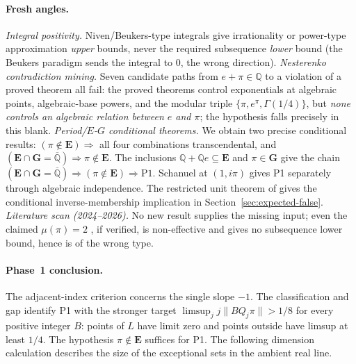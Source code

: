 \documentclass[11pt]{amsart}
\theoremstyle{definition}
\theoremstyle{remark}
\numberwithin{equation}{section}
\newcommand{\Q}{\mathbb{Q}}
\begin{document}
\paragraph{Fresh angles.}
\emph{Integral positivity.} Niven/Beukers-type integrals give irrationality or power-type approximation \emph{upper} bounds, never the required subsequence \emph{lower} bound (the Beukers paradigm sends the integral to $0$, the wrong direction). \emph{Nesterenko contradiction mining.} Seven candidate paths from $e+\pi\in\Q$ to a violation of a proved theorem all fail: the proved theorems control exponentials at algebraic points, algebraic-base powers, and the modular triple $\{\pi,e^\pi,\Gamma(1/4)\}$, but \emph{none controls an algebraic relation between $e$ and $\pi$}; the hypothesis falls precisely in this blank. \emph{Period/$E$-$G$ conditional theorems.} We obtain two precise conditional results: $(\pi\notin\mathbf{E})\Rightarrow$ all four combinations transcendental, and $(\mathbf{E}\cap\mathbf{G}=\overline{\Q})\Rightarrow\pi\notin\mathbf{E}$. The inclusions $\Q+\Q e\subseteq\mathbf E$ and $\pi\in\mathbf G$ give the chain $(\mathbf E\cap\mathbf G=\overline{\Q})\Rightarrow(\pi\notin\mathbf E)\Rightarrow\mathrm{P1}$. Schanuel at $(1,i\pi)$ gives P1 separately through algebraic independence. The restricted unit theorem of \cite{FischlerRivoal2026} gives the conditional inverse-membership implication in Section~\ref{sec:expected-false}. \emph{Literature scan (2024--2026).} No new result supplies the missing input; even the claimed $\mu(\pi)=2$ \cite{OpenAI2026}, if verified, is non-effective and gives no subsequence lower bound, hence is of the wrong type.

\paragraph{Phase~1 conclusion.} The adjacent-index criterion concerns the
single slope $-1$. The classification and gap identify P1 with the
stronger target $\limsup_j j\|BQ_j\pi\|>1/8$ for every positive integer
$B$: points of $L$ have limit zero and points outside have limsup at
least $1/4$. The hypothesis $\pi\notin\mathbf E$ suffices for P1.
The following dimension calculation describes the size of the
exceptional sets in the ambient real line.
\end{document}
